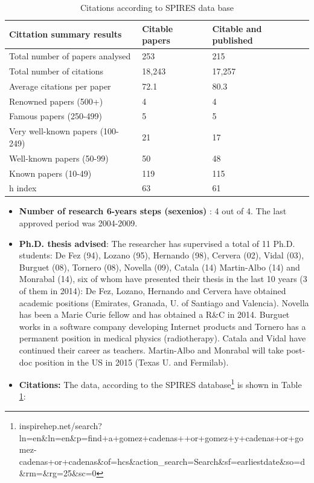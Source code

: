 \documentclass[a4paper,11pt,oneside]{article}
\begin{document}
\begin{table}[h!]
\begin{center}
\caption{Citations according to SPIRES data base}
\begin{tabular}{| l | l | l | }
\hline
Cittation summary results & Citable papers & Citable and published\\
\hline
Total number of papers analysed &	253	&215\\
Total number of citations &	18,243	& 17,257 \\
Average citations per paper &	72.1 &	80.3 \\
Renowned papers (500+)	 & 4	& 4 \\
Famous papers (250-499)	 & 5	& 5 \\
Very well-known papers (100-249) &	21 &	17\\
Well-known papers (50-99) &	50 &	48\\
Known papers (10-49) &	119	& 115\\
h index &63 &	61\\
\hline
\end{tabular}
\label{tab:spires}
\end{center}
\end{table} 

\begin{itemize}
\item {\bf Number of research 6-years steps (sexenios) }: 4 out of 4. The last approved period was 2004-2009. 
\item {\bf Ph.D. thesis advised}: The researcher has supervised a total of 11 Ph.D. students: De Fez (94), Lozano (95), Hernando (98), Cervera (02), Vidal (03), Burguet (08), Tornero (08), Novella (09), Catala (14) Martin-Albo (14) and Monrabal (14), six of whom have presented their thesis in the last 10 years (3 of them in 2014): De Fez, Lozano, Hernando and Cervera have obtained academic positions (Emirates, Granada, U. of Santiago and Valencia). Novella has been a Marie Curie fellow and has obtained a R\&C in 2014. Burguet works in a software company developing Internet products and Tornero has a permanent position in medical physics (radiotherapy). Catala and Vidal have continued their career as teachers. Martin-Albo and Monrabal will take post-doc position in the US in 2015 (Texas U. and Fermilab). 
\item{\bf Citations:} The data, according to the SPIRES database\footnote{inspirehep.net/search?ln=en\&ln=en\&p=find+a+gomez+cadenas++or+gomez+y+cadenas+or+gomez-cadenas+or+cadenas\&of=hcs\&action\_search=Search\&sf=earliestdate\&so=d\&rm=\&rg=25\&sc=0} is shown in Table \ref{tab:spires}:
\end{itemize}
\end{document}
